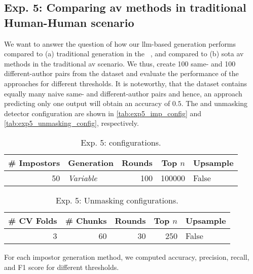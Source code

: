 \subsection{Exp. 5: Comparing \acs{av} methods in traditional Human-Human scenario}
\label{subsec:imp_gen}

We want to answer the question of how our \ac{llm}-based \imp{} generation performs compared to (a) traditional \imp{} generation in the \impAppr{}~\citep{koppel_determining_2014}, and compared to (b) \ac{sota} \ac{av} methods in the traditional \ac{av} scenario.
We thus, create 100 same- and 100 different-author pairs from the \dataStudent{} 
dataset and evaluate the performance of the approaches for different thresholds.
It is noteworthy, that the dataset contains equally many naive same- and different-author pairs and hence, an approach predicting only one output will obtain an accuracy of $0.5$.
The \impAppr{} and unmasking detector configuration are shown in \autoref{tab:exp5_imp_config} and \autoref{tab:exp5_unmasking_config}, respectively.

\begin{table}[h]
\centering\small
\caption{Exp. 5: \impAppr{} configurations.}
\label{tab:exp5_imp_config}
\begin{tabular}{@{}rlrrl@{}}   %
\toprule
\# Impostors & Generation & Rounds & Top $n$ & Upsample \\
\midrule
50 & \textit{Variable} & 100 & \num{100000} & False \\
\bottomrule
\end{tabular}%
\end{table}

\begin{table}[h]
\centering\small
\caption{Exp. 5: Unmasking configurations.}
\label{tab:exp5_unmasking_config}
\begin{tabular}{@{}rrrrl@{}}   %
\toprule
\# CV Folds & \# Chunks & Rounds & Top $n$ & Upsample \\
\midrule
3 & 60 & 30 & \num{250} & False \\
\bottomrule
\end{tabular}%
\end{table}

For each impostor generation method, we computed accuracy, precision, recall, and F1 score for different thresholds. 
